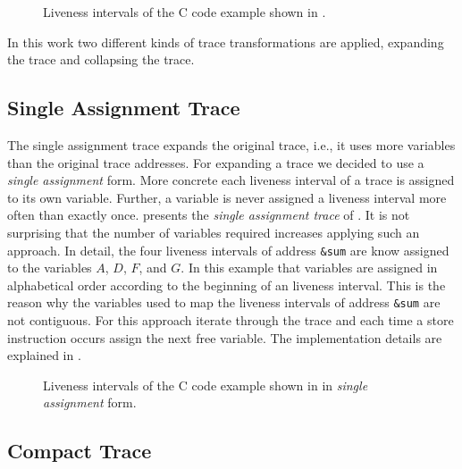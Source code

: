 \documentclass[onecolumn, openright, master, english, signatures]{dbrgrptt}
\begin{document}
\begin{figure}[!ht]
  \centering
  
  \caption{Liveness intervals of the C code example shown in .}
  \label{fig:trace-transformation-original}
\end{figure}

In this work two different kinds of \ac{trace} transformations are applied, expanding the \ac{trace} and collapsing the \ac{trace}.

\subsection{Single Assignment Trace}

The single assignment trace expands the original \ac{trace}, i.e., it uses more variables than the original \ac{trace} addresses.
For expanding a \ac{trace} we decided to use a \emph{single assignment} form.
More concrete each liveness interval of a \ac{trace} is assigned to its own variable.
Further, a variable is never assigned a liveness interval more often than exactly once.
 presents the \emph{single assignment trace} of .
It is not surprising that the number of variables required increases applying such an approach.
In detail, the four liveness intervals of address \texttt{\&sum} are know assigned to the variables $A$, $D$, $F$, and $G$.
In this example that variables are assigned in alphabetical order according to the beginning of an liveness interval.
This is the reason why the variables used to map the liveness intervals of address \texttt{\&sum} are not contiguous.
For this approach iterate through the \ac{trace} and each time a store instruction occurs assign the next free variable.
The implementation details are explained in .

\begin{figure}[!ht]
  \centering
  
  \caption{Liveness intervals of the C code example shown in  in \emph{single assignment} form.}
  \label{fig:trace-transformation-sa}
\end{figure}

\subsection{Compact Trace}
\end{document}

